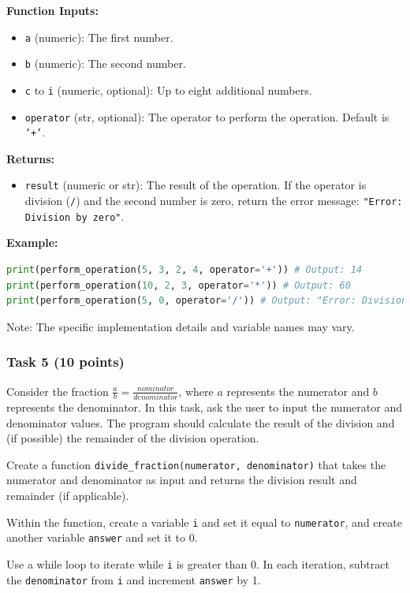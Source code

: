 \documentclass[12pt]{article}
\begin{document}
\textbf{Function Inputs:}
\begin{itemize}
\item \texttt{a} (numeric): The first number.
\item \texttt{b} (numeric): The second number.
\item \texttt{c} to \texttt{i} (numeric, optional): Up to eight additional numbers.
\item \texttt{operator} (str, optional): The operator to perform the operation. Default is \texttt{'+'}.
\end{itemize}

\textbf{Returns:}
\begin{itemize}
\item \texttt{result} (numeric or str): The result of the operation. If the operator is division (\texttt{/}) and the second number is zero, return the error message: \texttt{"Error: Division by zero"}.
\end{itemize}

\textbf{Example:}
\begin{lstlisting}[language=Python]
print(perform_operation(5, 3, 2, 4, operator='+')) # Output: 14
print(perform_operation(10, 2, 3, operator='*')) # Output: 60
print(perform_operation(5, 0, operator='/')) # Output: "Error: Division by zero"
\end{lstlisting}

Note: The specific implementation details and variable names may vary.

\subsubsection{Task 5 (10 points)}
Consider the fraction $\frac{a}{b} = \frac{nominator}{denominator}$, where $a$ represents the numerator and $b$ represents the denominator. In this task, ask the user to input the numerator and denominator values. The program should calculate the result of the division and (if possible) the remainder of the division operation.

Create a function \texttt{divide\_fraction(numerator, denominator)} that takes the numerator and denominator as input and returns the division result and remainder (if applicable).

Within the function, create a variable \texttt{i} and set it equal to \texttt{numerator}, and create another variable \texttt{answer} and set it to 0.

Use a while loop to iterate while \texttt{i} is greater than 0. In each iteration, subtract the \texttt{denominator} from \texttt{i} and increment \texttt{answer} by 1.
\end{document}
